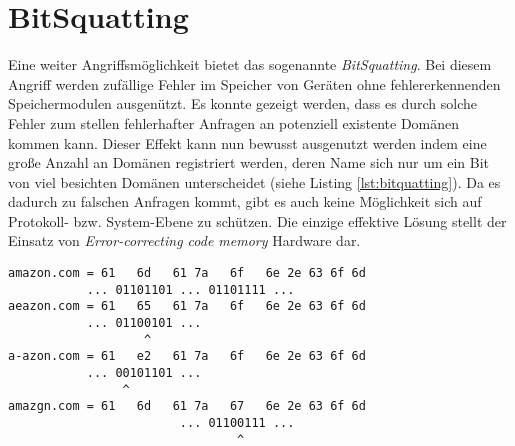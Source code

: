 \section{BitSquatting}

Eine weiter Angriffsmöglichkeit bietet das sogenannte \textit{BitSquatting}. Bei diesem Angriff werden zufällige Fehler im Speicher von Geräten ohne fehlererkennenden Speichermodulen ausgenützt. Es konnte gezeigt werden, dass es durch solche Fehler zum stellen fehlerhafter Anfragen an potenziell existente Domänen kommen kann\cite{Dinaburg2011}. Dieser Effekt kann nun bewusst ausgenutzt werden indem eine große Anzahl an Domänen registriert werden, deren Name sich nur um ein Bit von viel besichten Domänen unterscheidet (siehe Listing \ref{lst:bitquatting}). Da es dadurch zu falschen Anfragen kommt, gibt es auch keine Möglichkeit sich auf Protokoll- bzw. System-Ebene zu schützen. Die einzige effektive Lösung stellt der Einsatz von \textit{Error-correcting code memory} Hardware dar.  

\begin{lstlisting}[caption={Drei mögliche BitSquatting-Domänen für die Zieldomäne \texttt{amazon.com}}, label={lst:bitquatting}]
amazon.com = 61   6d   61 7a   6f   6e 2e 63 6f 6d
           ... 01101101 ... 01101111 ... 
aeazon.com = 61   65   61 7a   6f   6e 2e 63 6f 6d  
           ... 01100101 ...
                   ^
a-azon.com = 61   e2   61 7a   6f   6e 2e 63 6f 6d 
           ... 00101101 ...
                ^
amazgn.com = 61   6d   61 7a   67   6e 2e 63 6f 6d
                        ... 01100111 ...
                                ^
\end{lstlisting}
